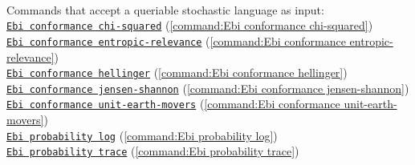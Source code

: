 {\\Commands that accept a queriable stochastic language as input: \\\null\qquad\hyperref[command:Ebi conformance chi-squared]{\texttt{Ebi conformance chi-squared}} (\cref{command:Ebi conformance chi-squared})\\\null\qquad\hyperref[command:Ebi conformance entropic-relevance]{\texttt{Ebi conformance entropic-relevance}} (\cref{command:Ebi conformance entropic-relevance})\\\null\qquad\hyperref[command:Ebi conformance hellinger]{\texttt{Ebi conformance hellinger}} (\cref{command:Ebi conformance hellinger})\\\null\qquad\hyperref[command:Ebi conformance jensen-shannon]{\texttt{Ebi conformance jensen-shannon}} (\cref{command:Ebi conformance jensen-shannon})\\\null\qquad\hyperref[command:Ebi conformance unit-earth-movers]{\texttt{Ebi conformance unit-earth-movers}} (\cref{command:Ebi conformance unit-earth-movers})\\\null\qquad\hyperref[command:Ebi probability log]{\texttt{Ebi probability log}} (\cref{command:Ebi probability log})\\\null\qquad\hyperref[command:Ebi probability trace]{\texttt{Ebi probability trace}} (\cref{command:Ebi probability trace})
}
